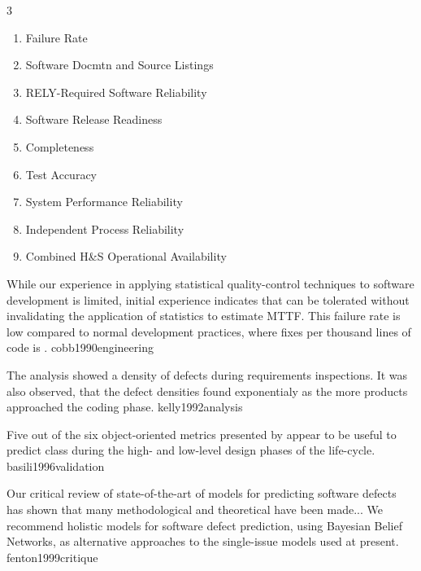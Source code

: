 \documentclass{article}
\begin{document}
{\begin{pptWide}{3}
\begin{enumerate}
  \item Failure Rate
  \item Software Docmtn and Source Listings
  \item RELY-Required Software Reliability
  \item Software Release Readiness
  \item Completeness
  \item Test Accuracy
  \item System Performance Reliability
  \item Independent Process Reliability
  \item Combined H\&S Operational Availability
  \end{enumerate}
  \end{pptWide}
  }


  {While our experience in applying statistical quality-control techniques to software development is limited, initial experience indicates that  can be tolerated without invalidating the application of statistics to estimate MTTF. This failure rate is low compared to normal development practices, where  fixes per thousand lines of code is .}
  {cobb1990engineering}

  {The analysis showed a  density of defects during requirements inspections. It was also observed, that the defect densities found  exponentialy as the more products approached the coding phase.}
  {kelly1992analysis}

  {Five out of the six object-oriented metrics presented by \citet{chidamber1994metrics} appear to be useful to predict class  during the high- and low-level design phases of the life-cycle.}
  {basili1996validation}

  {Our critical review of state-of-the-art of models for predicting software defects has shown that many methodological and theoretical  have been made... We recommend holistic models for software defect prediction, using Bayesian Belief Networks, as alternative approaches to the single-issue models used at present.}
  {fenton1999critique}
\end{document}
